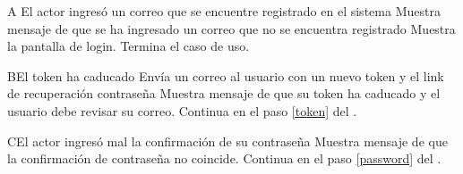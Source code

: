 		\begin{UCtrayectoriaA}{A}{ El actor ingresó un correo que se encuentre registrado en el sistema}
			\UCpaso Muestra mensaje de que se ha ingresado un correo que no se encuentra registrado
       \UCpaso   Muestra la pantalla de login.
            \UCpaso[] Termina el caso de uso.
		\end{UCtrayectoriaA}
		\begin{UCtrayectoriaA}{B}{El token ha caducado}
			\UCpaso Envía un correo al usuario con un nuevo token y el link de recuperación contraseña
			\UCpaso Muestra mensaje de que su token ha caducado y el usuario debe revisar su correo.
			\UCpaso Continua en el paso \ref{token} del .
		\end{UCtrayectoriaA}
		\begin{UCtrayectoriaA}{C}{El actor ingresó mal la confirmación de su contraseña}
			\UCpaso Muestra mensaje de que la confirmación de contraseña no coincide.
			\UCpaso Continua en el paso \ref{password} del .
		\end{UCtrayectoriaA}
        
		
